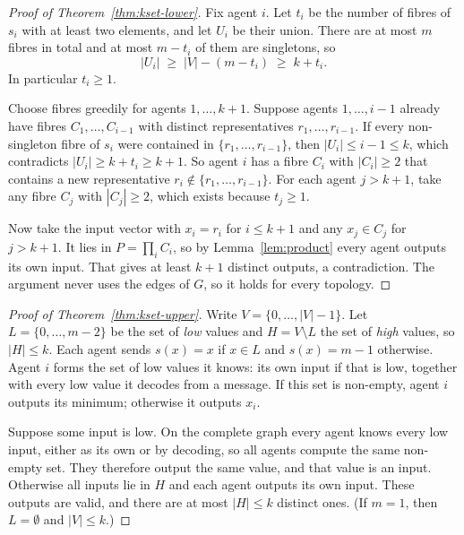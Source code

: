 \documentclass[11pt]{article}
\begin{document}
\begin{proof}[Proof of Theorem~\ref{thm:kset-lower}]
Fix agent $i$. Let $t_i$ be the number of fibres of $s_i$ with at least two elements, and let $U_i$ be their union. There are at most $m$ fibres in total and at most $m-t_i$ of them are singletons, so
\[
|U_i|\;\ge\;|V|-(m-t_i)\;\ge\;k+t_i .
\]
In particular $t_i\ge 1$.

Choose fibres greedily for agents $1,\dots,k+1$. Suppose agents $1,\dots,i-1$ already have fibres $C_1,\dots,C_{i-1}$ with distinct representatives $r_1,\dots,r_{i-1}$. If every non-singleton fibre of $s_i$ were contained in $\{r_1,\dots,r_{i-1}\}$, then $|U_i|\le i-1\le k$, which contradicts $|U_i|\ge k+t_i\ge k+1$. So agent $i$ has a fibre $C_i$ with $|C_i|\ge2$ that contains a new representative $r_i\notin\{r_1,\dots,r_{i-1}\}$. For each agent $j>k+1$, take any fibre $C_j$ with $|C_j|\ge 2$, which exists because $t_j\ge 1$.

Now take the input vector with $x_i=r_i$ for $i\le k+1$ and any $x_j\in C_j$ for $j>k+1$. It lies in $P=\prod_i C_i$, so by Lemma~\ref{lem:product} every agent outputs its own input. That gives at least $k+1$ distinct outputs, a contradiction. The argument never uses the edges of $G$, so it holds for every topology.
\end{proof}

\begin{proof}[Proof of Theorem~\ref{thm:kset-upper}]
Write $V=\{0,\dots,|V|-1\}$. Let $L=\{0,\dots,m-2\}$ be the set of \emph{low} values and $H=V\setminus L$ the set of \emph{high} values, so $|H|\le k$. Each agent sends $s(x)=x$ if $x\in L$ and $s(x)=m-1$ otherwise. Agent $i$ forms the set of low values it knows: its own input if that is low, together with every low value it decodes from a message. If this set is non-empty, agent $i$ outputs its minimum; otherwise it outputs $x_i$.

Suppose some input is low. On the complete graph every agent knows every low input, either as its own or by decoding, so all agents compute the same non-empty set. They therefore output the same value, and that value is an input. Otherwise all inputs lie in $H$ and each agent outputs its own input. These outputs are valid, and there are at most $|H|\le k$ distinct ones. (If $m=1$, then $L=\emptyset$ and $|V|\le k$.)
\end{proof}
\end{document}
